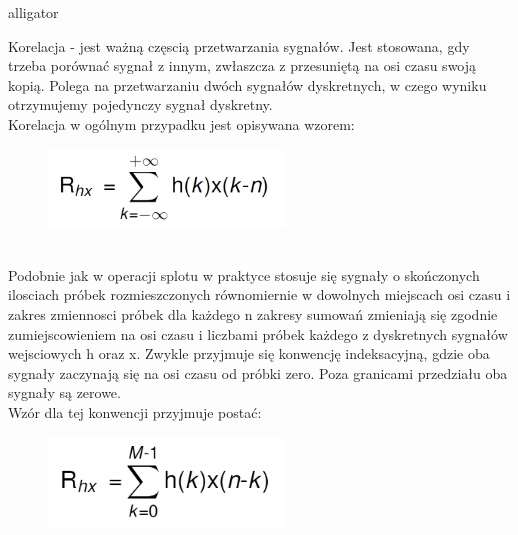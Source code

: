 \documentclass[12pt]{article}
\begin{document}
\begin{labeling}{alligator}
\item [Korelacja] - jest ważną częscią przetwarzania sygnałów. Jest stosowana, gdy trzeba porównać sygnał z innym, zwłaszcza z przesuniętą na osi czasu swoją kopią.
Polega na przetwarzaniu dwóch sygnałów dyskretnych, w czego wyniku otrzymujemy pojedynczy sygnał dyskretny.
\\Korelacja w ogólnym przypadku jest opisywana wzorem:
\begin{figure}[h!]
 \centering
 \includegraphics[width=6.3cm]{kor.PNG}
 \vspace{-0.3cm}
 \label{Widok_aplikacjis}
\end{figure}
\\Podobnie jak w operacji splotu w praktyce stosuje się sygnały o skończonych ilosciach próbek rozmieszczonych równomiernie w dowolnych miejscach osi czasu i zakres zmiennosci próbek dla każdego n zakresy sumowań zmieniają się zgodnie zumiejscowieniem na osi czasu i liczbami próbek każdego z dyskretnych sygnałów wejsciowych h oraz x. Zwykle przyjmuje się konwencję indeksacyjną, gdzie oba sygnały zaczynają się  na osi czasu od próbki zero. Poza granicami przedziału oba sygnały są zerowe. 
\\Wzór dla tej konwencji przyjmuje postać: 
\begin{figure}[h!]
 \centering
 \includegraphics[width=6.3cm]{korW.PNG}
 \vspace{-0.3cm}
 \label{kw}
\end{figure}


\end{labeling}

\end{document}
